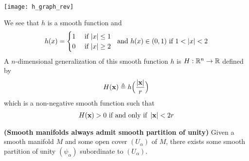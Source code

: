 \documentclass{report}
\begin{document}
\begin{mdframed}
\begin{center}
   \begin{minipage}{0.9\linewidth}  
       \centering
       \texttt{[image: h\_graph\_rev]}
   \end{minipage}
\end{center}
We see that $h$ is a smooth function and 
\begin{align*}
h(x)=\begin{cases}
  1& \text{ if $\left|x\right|\leq 1$ }\\
  0& \text{ if $\left|x\right|\geq 2$ }
\end{cases}\text{ and }h(x)\in (0,1)\text{ if } 1< \left|x\right|< 2
\end{align*}
A $n$-dimensional generalization of this smooth function $h$ is  $H:\mathbb{R}^n\rightarrow \mathbb{R}$ defined by 
\begin{align*}
H(\textbf{x})\triangleq  h\Big(\frac{\left|\textbf{x}\right|}{r}\Big)
\end{align*}
which is a non-negative smooth function such that 
\begin{align*}
H(\textbf{x})>0\text{ if and only if }\left|\textbf{x}\right|< 2r
\end{align*}
\end{mdframed}
\begin{theorem}
\label{Smooth manifolds always admit smooth partition of unity}
\textbf{(Smooth manifolds always admit smooth partition of unity)} Given a smooth manifold $M$ and some open cover  $(U_\alpha )$ of $M$, there exists some smooth partition of unity  $(\psi_\alpha )$ subordinate to $(U_\alpha )$. 
\end{theorem}
\end{document}
